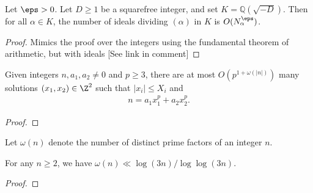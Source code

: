 \begin{lemma} \label{lem:DivisorBoundQuadField}
  Let $\eps>0$. Let $D\ge1$ be a squarefree integer, and set $K=\mathbb{Q}(\sqrt{-D})$.
  Then for all $\alpha\in K$, the number of ideals dividing $(\alpha)$ in $K$
  is $O(N_\alpha^\eps)$.
\end{lemma}
\begin{proof}
  Mimics the proof over the integers
  using the fundamental theorem of arithmetic, but with ideals
  [See link in comment] %
\end{proof}

\begin{theorem} \label{thm:BombierSchmidtforThueEqs}
  Given integers $n,a_1,a_2\neq0$ and $p\ge3$, there are
  at most $O(p^{1+\omega(|n|)})$ many solutions
  $(x_1,x_2)\in\Z^2$ such that $|x_i|\le X_i$ and
  \begin{align*}
    n = a_1 x_1^p + a_2 x_2^p.
  \end{align*}
\end{theorem}
\begin{proof}
\end{proof}


\begin{definition}\label{def:omega}
Let $\omega(n)$ denote the number of distinct prime factors of an integer $n$.
\end{definition}

\begin{lemma} \label{lem:omegaUpperBound} 
For any $n\ge2$, we have $\omega(n) \ll \log(3n)/\log\log(3n)$.
\end{lemma}
\begin{proof}
\end{proof}


